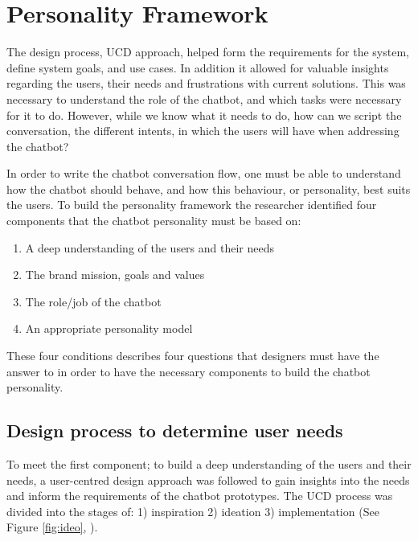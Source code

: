 \section{Personality Framework}

The design process, UCD approach, helped form the requirements for the system, define system goals, and use cases. In addition it allowed for valuable insights regarding the users, their needs and frustrations with current solutions. This was necessary to understand the role of the chatbot, and which tasks were necessary for it to do. However, while we know what it needs to do, how can we script the conversation, the different intents, in which the users will have when addressing the chatbot? 

In order to write the chatbot conversation flow, one must be able to understand how the chatbot should behave, and how this behaviour, or personality, best suits the users. To build the personality framework the researcher identified four components that the chatbot personality must be based on:

\begin{enumerate}
    \item A deep understanding of the users and their needs 
    \item The brand mission, goals and values
    \item The role/job of the chatbot
    \item An appropriate personality model
\end{enumerate}

These four conditions describes four questions that designers must have the answer to in order to have the necessary components to build the chatbot personality.

\vspace{5mm} %

\subsection{Design process to determine user needs}

To meet the first component; to build a deep understanding of the users and their needs, a user-centred design approach was followed to gain insights into the needs and inform the requirements of the chatbot prototypes. The UCD process was divided into the stages of:  1) inspiration 2) ideation 3) implementation (See Figure \ref{fig:ideo}, \cite{IDEO.org}).

